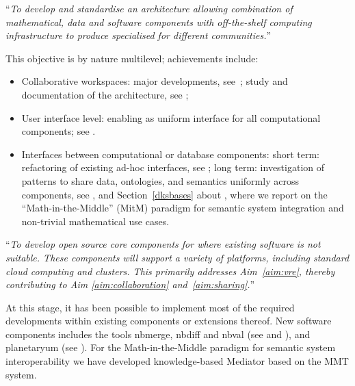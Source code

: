 \begin{compactenum}[\bf O1\rm:]
\item\label{objective:framework} ``\emph{To develop and standardise an architecture
    allowing combination of mathematical, data and software components with off-the-shelf
    computing infrastructure to produce specialised \VREs for different communities.}''

  This objective is by nature multilevel; achievements include:
  \begin{itemize}
  \item Collaborative workspaces: major \JupyterHub developments,
    see~; study and documentation of the \SMC
    architecture, see ;
  \item User interface level: enabling \Jupyter as uniform interface for all computational
    components; see .
  \item Interfaces between computational or database components: short term: refactoring
    of existing ad-hoc interfaces, see ; long term:
    investigation of patterns to share data, ontologies, and semantics uniformly across
    components, see , and
    Section~\ref{dksbases} about , where we report on the
    ``Math-in-the-Middle'' (MitM) paradigm for semantic system integration and non-trivial
    mathematical use cases. 
  \end{itemize}

\item\label{objectives:core} ``\emph{To develop open source core components
  for \VREs where existing software is not suitable. These components
  will support a variety of platforms, including standard cloud
  computing and clusters. This primarily addresses Aim~\ref{aim:vre},
  thereby contributing to Aim \ref{aim:collaboration}
  and~\ref{aim:sharing}.}''

At this stage, it has been possible to implement most of the required developments within
existing components or extensions thereof. New software components includes the tools
nbmerge, nbdiff and nbval (see  and
), and planetaryum (see ). For the
Math-in-the-Middle paradigm for semantic system interoperability we have developed
knowledge-based Mediator based on the MMT system. 


\end{compactenum}
